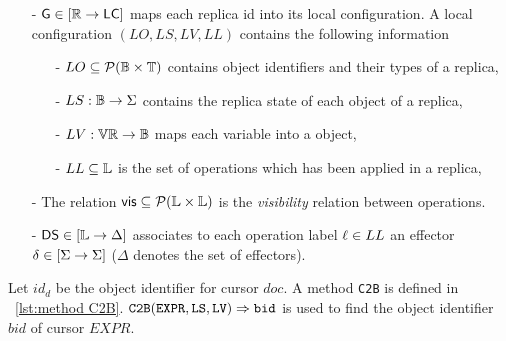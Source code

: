 \begin{itemize}
\setlength{\itemsep}{0.5pt}
\item[-] $\mathsf{G} \in [\mathbb{R} \rightarrow \mathsf{LC}]$ maps each replica id into its local configuration. A local configuration $(LO, LS, LV, LL)$ contains the following information

    \begin{itemize}
    \setlength{\itemsep}{0.5pt}
    \item[-] $LO \subseteq \mathcal{P}(\mathbb{B} \times \mathbb{T})$ contains object identifiers and their types of a replica,

    \item[-] $LS: \mathbb{B} \rightarrow \Sigma$ contains the replica state of each object of a replica,

    \item[-] $LV: \mathbb{VR} \rightarrow \mathbb{B}$ maps each variable into a object,

    \item[-] $LL \subseteq \mathbb{L}$ is the set of operations which has been applied in a replica,
    \end{itemize}

\item[-] The relation $\mathsf{vis}\subseteq \mathcal{P}(\mathbb{L} \times \mathbb{L})$ is the \emph{visibility} relation between operations.

\item[-] $\mathsf{DS}\in [\mathbb{L} \rightarrow \Delta]$ associates to each operation label $\ell \in LL$ an effector $\delta\in [\Sigma \rightarrow \Sigma]$ ($\Delta$ denotes the set of effectors).
\end{itemize}

Let $id_d$ be the object identifier for cursor $doc$. A method {\tt C2B} is defined in \figureautorefname~\ref{lst:method C2B}. $\alabellong[{\tt C2B}]{EXPR,LS,LV}{bid}{}$ is used to find the object identifier $bid$ of cursor $EXPR$.

